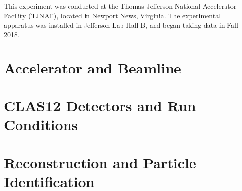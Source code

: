 This experiment was conducted at the Thomas Jefferson National Accelerator Facility (TJNAF), located in Newport News, Virginia. The experimental apparatus was installed in Jefferson Lab Hall-B, and began taking data in Fall 2018. 

\section{Accelerator and Beamline}
                  


\section{CLAS12 Detectors and Run Conditions}\label{sec:clas12exp}
    


\section{Reconstruction and Particle Identification}
    







